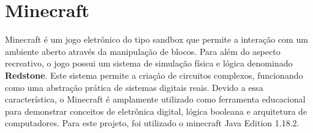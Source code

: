 \section{Minecraft}

Minecraft é um jogo eletrônico do tipo sandbox que permite a interação com um ambiente aberto através da manipulação de blocos. Para além do aspecto recreativo, o jogo possui um sistema de simulação física e lógica denominado \textbf{Redstone}. Este sistema permite a criação de circuitos complexos, funcionando como uma abstração prática de sistemas digitais reais. Devido a essa característica, o Minecraft é amplamente utilizado como ferramenta educacional para demonstrar conceitos de eletrônica digital, lógica booleana e arquitetura de computadores. Para este projeto, foi utilizado o minecraft Java Edition 1.18.2.







